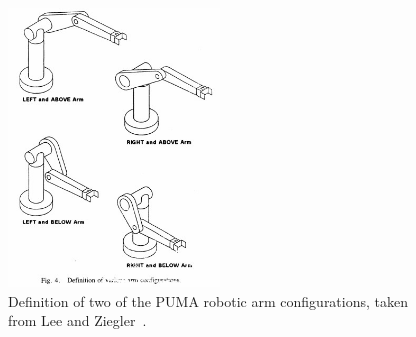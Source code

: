 \documentclass{article}
\begin{document}
\begin{figure}[b!]
\begin{centering}
\includegraphics[width=0.5\textwidth]{puma.jpg}
\caption{Definition of two of the PUMA robotic arm configurations, taken from Lee and Ziegler~\cite{lee1984geometric}.}
\label{puma}
\end{centering}
\end{figure}
\end{document}
